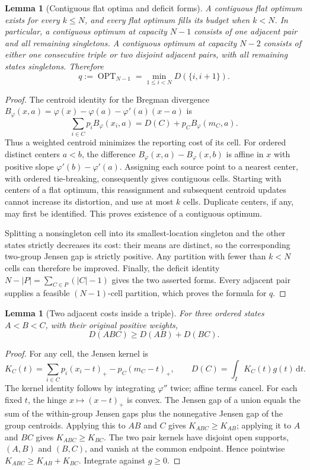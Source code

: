 \documentclass[11pt]{article}
\newtheorem{lemma}[theorem]{Lemma}
\theoremstyle{remark}\newtheorem{remark}[theorem]{Remark}
\newcommand{\OPT}{\operatorname{OPT}}
\newcommand{\dd}{\,\mathrm dt}
\begin{document}
\begin{lemma}[Contiguous flat optima and deficit forms]
\label{lem:flat}
A contiguous flat optimum exists for every $k\le N$, and every flat
optimum fills its budget when $k<N$. In particular, a contiguous optimum
at capacity $N-1$ consists of one adjacent pair and all remaining
singletons. A contiguous optimum at capacity $N-2$ consists of either
one consecutive triple or two disjoint adjacent pairs, with all remaining
states singletons. Therefore
\[
 q:=\OPT_{N-1}=\min_{1\le i<N}D(\{i,i+1\}).
\]
\end{lemma}

\begin{proof}
The centroid identity for the Bregman divergence
$B_\varphi(x,a)=\varphi(x)-\varphi(a)-\varphi'(a)(x-a)$ is
\[
 \sum_{i\in C}p_iB_\varphi(x_i,a)
 =D(C)+p_CB_\varphi(m_C,a).
\]
Thus a weighted centroid minimizes the reporting cost of its cell. For
ordered distinct centers $a<b$, the difference
$B_\varphi(x,a)-B_\varphi(x,b)$ is affine in $x$ with positive slope
$\varphi'(b)-\varphi'(a)$. Assigning each source point to a nearest center,
with ordered tie-breaking, consequently gives contiguous cells. Starting
with centers of a flat optimum, this reassignment and subsequent centroid
updates cannot increase its distortion, and use at most $k$ cells.
Duplicate centers, if any, may first be identified. This proves existence
of a contiguous optimum.

Splitting a nonsingleton cell into its smallest-location singleton and
the other states strictly decreases its cost: their means are distinct,
so the corresponding two-group Jensen gap is strictly positive. Any
partition with fewer than $k<N$ cells can therefore be improved. Finally,
the deficit identity
$N-|P|=\sum_{C\in P}(|C|-1)$ gives the two asserted forms. Every adjacent
pair supplies a feasible $(N-1)$-cell partition, which proves the formula
for $q$.
\end{proof}

\begin{lemma}[Two adjacent costs inside a triple]
\label{lem:triple}
For three ordered states $A<B<C$, with their original positive weights,
\[
 D(ABC)\ge D(AB)+D(BC).
\]
\end{lemma}

\begin{proof}
For any cell, the Jensen kernel is
\[
 K_C(t)=\sum_{i\in C}p_i(x_i-t)_+-p_C(m_C-t)_+,
 \qquad D(C)=\int_I K_C(t)g(t)\dd.
\]
The kernel identity follows by integrating $\varphi''$ twice; affine
terms cancel. For each fixed $t$, the hinge $x\mapsto(x-t)_+$ is convex.
The Jensen gap of a union equals the sum of the within-group Jensen gaps
plus the nonnegative Jensen gap of the group centroids. Applying this to
$AB$ and $C$ gives $K_{ABC}\ge K_{AB}$; applying it to $A$ and $BC$ gives
$K_{ABC}\ge K_{BC}$. The two pair kernels have disjoint open supports,
$(A,B)$ and $(B,C)$, and vanish at the common endpoint. Hence pointwise
$K_{ABC}\ge K_{AB}+K_{BC}$. Integrate against $g\ge0$.
\end{proof}
\end{document}
